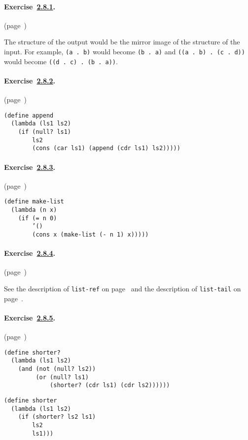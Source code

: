 \paragraph{Exercise \hyperref[start_g33]{2.8.1}. }(page \pageref{start_s149})

  The structure of the output would be the mirror image of the structure of the input. For example, \texttt{(a . b)} would become \texttt{(b . a)} and \texttt{((a . b) . (c . d))} would become \texttt{((d . c) . (b . a))}. 


\paragraph{Exercise \hyperref[start_g34]{2.8.2}. }(page \pageref{start_s150})

  
\begin{alltt}
 (define append
   (lambda (ls1 ls2)
     (if (null? ls1)
         ls2
         (cons (car ls1) (append (cdr ls1) ls2)))))
\end{alltt}



\paragraph{Exercise \hyperref[start_g35]{2.8.3}. }(page \pageref{start_s152})

  
\begin{alltt}
 (define make-list
   (lambda (n x)
     (if (= n 0)
         '()
         (cons x (make-list (- n 1) x)))))
\end{alltt}



\paragraph{Exercise \hyperref[start_g36]{2.8.4}. }(page \pageref{start_s154})

  See the description of \texttt{list-ref} on page \pageref{objects_defn_list_ref} and the description of \texttt{list-tail} on page \pageref{objects_defn_list_tail}. 


\paragraph{Exercise \hyperref[start_g37]{2.8.5}. }(page \pageref{start_s155})

  
\begin{alltt}
 (define shorter?
   (lambda (ls1 ls2)
     (and (not (null? ls2))
          (or (null? ls1)
              (shorter? (cdr ls1) (cdr ls2)))))) 

(define shorter
   (lambda (ls1 ls2)
     (if (shorter? ls2 ls1)
         ls2
         ls1)))
\end{alltt}



